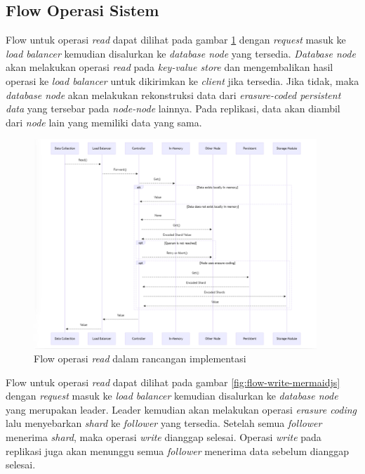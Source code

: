 \subsection{Flow Operasi Sistem}
\label{subsection:system-flow}

Flow untuk operasi \textit{read} dapat dilihat pada gambar \ref{fig:flow-read-mermaidjs} dengan \textit{request} masuk ke \textit{load balancer} kemudian disalurkan ke \textit{database node} yang tersedia. \textit{Database node} akan melakukan operasi \textit{read} pada \textit{key-value store} dan mengembalikan hasil operasi ke \textit{load balancer} untuk dikirimkan ke \textit{client} jika tersedia. Jika tidak, maka \textit{database node} akan melakukan rekonstruksi data dari \textit{erasure-coded persistent data} yang tersebar pada \textit{node-node} lainnya. Pada replikasi, data akan diambil dari \textit{node} lain yang memiliki data yang sama.

\begin{figure}[!ht]
    \centering
    \includegraphics[width=0.95\textwidth]{resources/chapter-3/flow-read-mermaidjs.png}
    \caption{Flow operasi \textit{read} dalam rancangan implementasi}
    \label{fig:flow-read-mermaidjs}
\end{figure}

Flow untuk operasi \textit{read} dapat dilihat pada gambar \ref{fig:flow-write-mermaidjs} dengan \textit{request} masuk ke \textit{load balancer} kemudian disalurkan ke \textit{database node} yang merupakan leader. Leader kemudian akan melakukan operasi \textit{erasure coding} lalu menyebarkan \textit{shard} ke \textit{follower} yang tersedia. Setelah semua \textit{follower} menerima \textit{shard}, maka operasi \textit{write} dianggap selesai. Operasi \textit{write} pada replikasi juga akan menunggu semua \textit{follower} menerima data sebelum dianggap selesai. 


